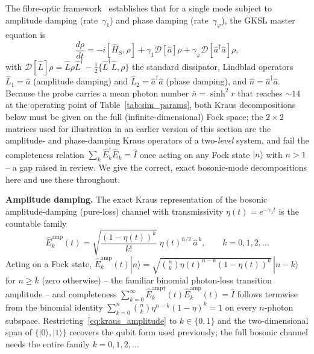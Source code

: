\documentclass[journal]{IEEEtran}
\begin{document}
The fibre-optic framework~\cite{gautum2024rigorous} establishes that for a single mode subject to amplitude damping (rate~$\gamma_1$) and phase damping (rate~$\gamma_\varphi$), the GKSL master equation is
\begin{equation}\label{eq:single_gksl}
\frac{d\rho}{dt} = -i[\hat{H}_S, \rho] + \gamma_1\mathcal{D}[\hat a]\rho + \gamma_\varphi\mathcal{D}[\hat a^\dagger\hat a]\rho,
\end{equation}
with $\mathcal D[\hat L]\rho=\hat L\rho\hat L^\dagger-\tfrac12\{\hat L^\dagger\hat L,\rho\}$ the standard dissipator, Lindblad operators $\hat{L}_1 = \hat{a}$ (amplitude damping) and $\hat{L}_2 = \hat{a}^\dagger\hat{a}$ (phase damping), and $\hat n=\hat a^\dagger\hat a$. Because the probe carries a mean photon number $\bar n=\sinh^2r$ that reaches $\sim 14$ at the operating point of Table~\ref{tab:sim_params}, both Kraus decompositions below must be given on the full (infinite-dimensional) Fock space; the $2\times2$ matrices used for illustration in an earlier version of this section are the amplitude- and phase-damping Kraus operators of a two-\emph{level} system, and fail the completeness relation $\sum_k\hat E_k^\dagger\hat E_k=\hat I$ once acting on any Fock state $|n\rangle$ with $n>1$ -- a gap raised in review. We give the correct, exact bosonic-mode decompositions here and use these throughout.

\textbf{Amplitude damping.} The exact Kraus representation of the bosonic amplitude-damping (pure-loss) channel with transmissivity $\eta(t)=e^{-\gamma_1t}$ is the countable family~\cite{weedbrook2012gaussian}
\begin{equation}\label{eq:kraus_amplitude}
\hat{E}_k^{\text{amp}}(t) = \sqrt{\frac{(1-\eta(t))^k}{k!}}\;\eta(t)^{\hat n/2}\,\hat a^{\,k}, \qquad k=0,1,2,\dots
\end{equation}
Acting on a Fock state, $\hat E_k^{\text{amp}}(t)|n\rangle=\sqrt{\binom{n}{k}\eta(t)^{n-k}(1-\eta(t))^{k}}\,|n-k\rangle$ for $n\geq k$ (zero otherwise) -- the familiar binomial photon-loss transition amplitude -- and completeness $\sum_{k=0}^\infty\hat E_k^{\text{amp}\dagger}(t)\hat E_k^{\text{amp}}(t)=\hat I$ follows termwise from the binomial identity $\sum_{k=0}^n\binom{n}{k}\eta^{n-k}(1-\eta)^k=1$ on every $n$-photon subspace. Restricting~\eqref{eq:kraus_amplitude} to $k\in\{0,1\}$ and the two-dimensional span of $\{|0\rangle,|1\rangle\}$ recovers the qubit form used previously; the full bosonic channel needs the entire family $k=0,1,2,\dots$
\end{document}
